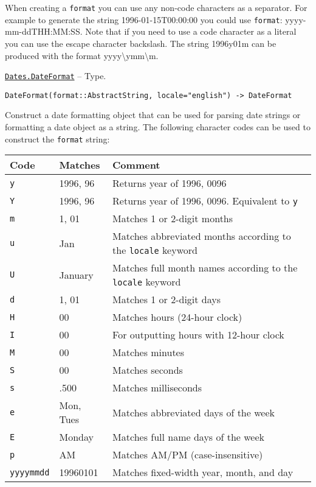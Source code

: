 \begin{adjustwidth}{2em}{0pt}
When creating a \texttt{format} you can use any non-code characters as a separator. For example to generate the string {\textquotedbl}1996-01-15T00:00:00{\textquotedbl} you could use \texttt{format}: {\textquotedbl}yyyy-mm-ddTHH:MM:SS{\textquotedbl}. Note that if you need to use a code character as a literal you can use the escape character backslash. The string {\textquotedbl}1996y01m{\textquotedbl} can be produced with the format {\textquotedbl}yyyy{\textbackslash}ymm{\textbackslash}m{\textquotedbl}.



\end{adjustwidth}
\hypertarget{18093459443158853001}{}
\hyperlink{18093459443158853001}{\texttt{Dates.DateFormat}}  -- {Type.}

\begin{adjustwidth}{2em}{0pt}


\begin{verbatim}
DateFormat(format::AbstractString, locale="english") -> DateFormat
\end{verbatim}

Construct a date formatting object that can be used for parsing date strings or formatting a date object as a string. The following character codes can be used to construct the \texttt{format} string:


\begin{table}[h]

\begin{tabulary}{\linewidth}{|L|L|L|}
\hline
Code & Matches & Comment \\
\hline
\texttt{y} & 1996, 96 & Returns year of 1996, 0096 \\
\hline
\texttt{Y} & 1996, 96 & Returns year of 1996, 0096. Equivalent to \texttt{y} \\
\hline
\texttt{m} & 1, 01 & Matches 1 or 2-digit months \\
\hline
\texttt{u} & Jan & Matches abbreviated months according to the \texttt{locale} keyword \\
\hline
\texttt{U} & January & Matches full month names according to the \texttt{locale} keyword \\
\hline
\texttt{d} & 1, 01 & Matches 1 or 2-digit days \\
\hline
\texttt{H} & 00 & Matches hours (24-hour clock) \\
\hline
\texttt{I} & 00 & For outputting hours with 12-hour clock \\
\hline
\texttt{M} & 00 & Matches minutes \\
\hline
\texttt{S} & 00 & Matches seconds \\
\hline
\texttt{s} & .500 & Matches milliseconds \\
\hline
\texttt{e} & Mon, Tues & Matches abbreviated days of the week \\
\hline
\texttt{E} & Monday & Matches full name days of the week \\
\hline
\texttt{p} & AM & Matches AM/PM (case-insensitive) \\
\hline
\texttt{yyyymmdd} & 19960101 & Matches fixed-width year, month, and day \\
\hline
\end{tabulary}


\end{table}
\end{adjustwidth}
